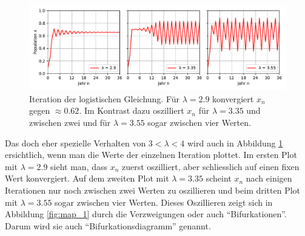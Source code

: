 \begin{figure}
    \includegraphics[width=\linewidth]{papers/logistic/figures/pop_logistic_2.pdf}
    \caption{
        Iteration der logistischen Gleichung. 
        Für $\lambda = 2.9$ konvergiert $x_n$ gegen
        $\approx 0.62$.
        Im Kontrast dazu oszilliert $x_n$ für
        $\lambda = 3.35$ und zwischen zwei 
        und für
        $\lambda = 3.55$ sogar zwischen vier Werten. 
    }
    \label{fig:pop_logistic_2}
\end{figure}
Das doch eher spezielle Verhalten von $3 < \lambda < 4$ wird 
auch in Abbildung \ref{fig:pop_logistic_2} ersichtlich,
wenn man die Werte der einzelnen Iteration plottet.
Im ersten Plot mit $\lambda = 2.9$ sieht man, dass $x_n$ zuerst oszilliert,
aber schliesslich auf einen fixen Wert konvergiert.
Auf dem zweiten Plot mit $\lambda = 3.35$ scheint $x_n$ 
nach einigen Iterationen nur noch
zwischen zwei Werten zu oszillieren und beim
dritten Plot mit $\lambda = 3.55$ sogar zwischen vier Werten. 
Dieses Oszillieren zeigt sich in Abbildung \ref{fig:map_1}
durch die Verzweigungen oder auch ``Bifurkationen''. 
Darum wird sie auch ``Bifurkationsdiagramm'' genannt. 

